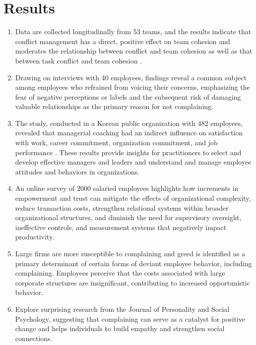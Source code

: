 \documentclass[a4paper,12pt]{article}
\begin{document}
\section{Results}
\begin{enumerate}
    \item Data are collected longitudinally from 53 teams, and the results indicate that conflict management has a direct, positive effect on team cohesion and moderates the relationship between conflict and team cohesion as well as that between task conflict and team cohesion \cite{conflict_management}. 
    \item Drawing on interviews with 40 employees,  findings reveal a common subject among employees who refrained from voicing their concerns, emphasizing the fear of negative perceptions or labels and the subsequent risk of damaging valuable relationships as the primary reason for not complaining\cite{employee_silence}.
    \item The study, conducted in a Korean public organization with 482 employees, revealed that managerial coaching had an indirect influence on satisfaction with work, career commitment, organization commitment, and job performance \cite{managerial_coaching}. These results provide insights for practitioners to select and develop effective managers and leaders and understand and manage employee attitudes and behaviors in organizations.
    \item An online survey of 2000 salaried employees highlights how increments in empowerment and trust can mitigate the effects of organizational complexity, reduce transaction costs, strengthen relational systems within broader organizational structures, and diminish the need for supervisory oversight, ineffective controls, and measurement systems that negatively impact productivity\cite{employee_manager}.
    \item  Large firms are more susceptible to complaining and greed is identified as a primary determinant of certain forms of deviant employee behavior, including complaining. Employees perceive that the costs associated with large corporate structures are insignificant, contributing to increased opportunistic behavior\cite{opportunistic_complain}.
    \item Explore surprising research from the Journal of Personality and Social Psychology, suggesting that complaining can serve as a catalyst for positive change and helps individuals to build empathy and strengthen social connections\cite{benefits_complain}.
\end{enumerate}
\end{document}
